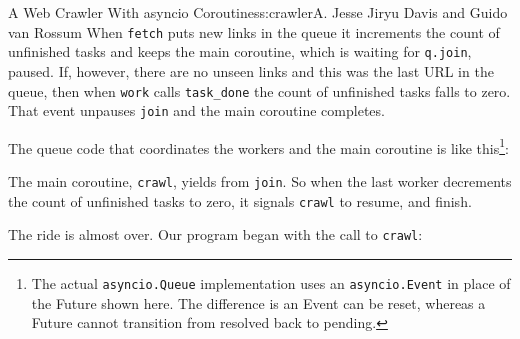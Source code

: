 \begin{aosachapter}{A Web Crawler With asyncio Coroutines}{s:crawler}{A. Jesse Jiryu Davis and Guido van Rossum}
When \texttt{fetch} puts new links in the queue it increments the count
of unfinished tasks and keeps the main coroutine, which is waiting for
\texttt{q.join}, paused. If, however, there are no unseen links and this
was the last URL in the queue, then when \texttt{work} calls
\texttt{task\_done} the count of unfinished tasks falls to zero. That
event unpauses \texttt{join} and the main coroutine completes.

The queue code that coordinates the workers and the main coroutine is
like this\footnote{The actual \texttt{asyncio.Queue} implementation uses
  an \texttt{asyncio.Event} in place of the Future shown here. The
  difference is an Event can be reset, whereas a Future cannot
  transition from resolved back to pending.}:

\begin{Shaded}
\begin{Highlighting}[]
 
     \NormalTok{(}\NormalTok{):}
    
     

     \NormalTok{):}
         \NormalTok{:}
            \NormalTok{)}

     \NormalTok{):}
         \NormalTok{:}
              
\end{Highlighting}
\end{Shaded}

The main coroutine, \texttt{crawl}, yields from \texttt{join}. So when
the last worker decrements the count of unfinished tasks to zero, it
signals \texttt{crawl} to resume, and finish.

The ride is almost over. Our program began with the call to
\texttt{crawl}:


\end{aosachapter}
